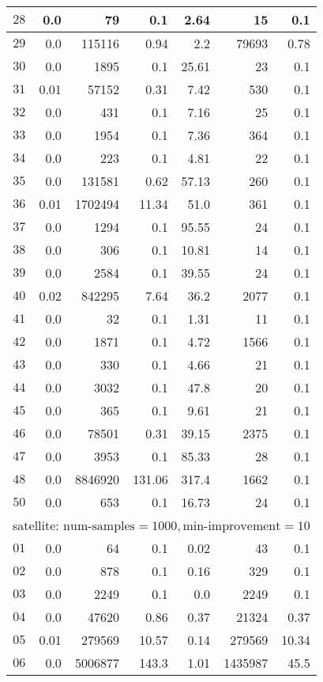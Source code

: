 \begin{longtable}{|c||r|r|r||r|r|r|}
$28$ & 0.0 & 79 & 0.1 &2.64 & 15 & 0.1 \\\hline
$29$ & 0.0 & 115116 & 0.94 &2.2 & 79693 & 0.78 \\\hline
$30$ & 0.0 & 1895 & 0.1 &25.61 & 23 & 0.1 \\\hline
$31$ & 0.01 & 57152 & 0.31 &7.42 & 530 & 0.1 \\\hline
$32$ & 0.0 & 431 & 0.1 &7.16 & 25 & 0.1 \\\hline
$33$ & 0.0 & 1954 & 0.1 &7.36 & 364 & 0.1 \\\hline
$34$ & 0.0 & 223 & 0.1 &4.81 & 22 & 0.1 \\\hline
$35$ & 0.0 & 131581 & 0.62 &57.13 & 260 & 0.1 \\\hline
$36$ & 0.01 & 1702494 & 11.34 &51.0 & 361 & 0.1 \\\hline
$37$ & 0.0 & 1294 & 0.1 &95.55 & 24 & 0.1 \\\hline
$38$ & 0.0 & 306 & 0.1 &10.81 & 14 & 0.1 \\\hline
$39$ & 0.0 & 2584 & 0.1 &39.55 & 24 & 0.1 \\\hline
$40$ & 0.02 & 842295 & 7.64 &36.2 & 2077 & 0.1 \\\hline
$41$ & 0.0 & 32 & 0.1 &1.31 & 11 & 0.1 \\\hline
$42$ & 0.0 & 1871 & 0.1 &4.72 & 1566 & 0.1 \\\hline
$43$ & 0.0 & 330 & 0.1 &4.66 & 21 & 0.1 \\\hline
$44$ & 0.0 & 3032 & 0.1 &47.8 & 20 & 0.1 \\\hline
$45$ & 0.0 & 365 & 0.1 &9.61 & 21 & 0.1 \\\hline
$46$ & 0.0 & 78501 & 0.31 &39.15 & 2375 & 0.1 \\\hline
$47$ & 0.0 & 3953 & 0.1 &85.33 & 28 & 0.1 \\\hline
$48$ & 0.0 & 8846920 & 131.06 &317.4 & 1662 & 0.1 \\\hline
$50$ & 0.0 & 653 & 0.1 &16.73 & 24 & 0.1 \\\hline

\multicolumn{7}{|l|}{satellite: $\text{num-samples}=1000,\text{min-improvement}=10$}\\\hline
$01$ & 0.0 & 64 & 0.1 &0.02 & 43 & 0.1 \\\hline
$02$ & 0.0 & 878 & 0.1 &0.16 & 329 & 0.1 \\\hline
$03$ & 0.0 & 2249 & 0.1 &0.0 & 2249 & 0.1 \\\hline
$04$ & 0.0 & 47620 & 0.86 &0.37 & 21324 & 0.37 \\\hline
$05$ & 0.01 & 279569 & 10.57 &0.14 & 279569 & 10.34 \\\hline
$06$ & 0.0 & 5006877 & 143.3 &1.01 & 1435987 & 45.5 \\\hline


\end{longtable}
